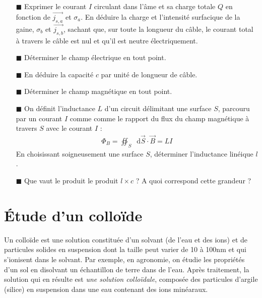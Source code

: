 \documentclass{report}
\newcommand*\dif{\mathop{}\!\mathrm{d}}
\begin{document}
\begin{itemize}

	\item[$\blacksquare$] Exprimer le courant $I$ circulant dans l'âme et sa charge totale $Q$ en fonction de $\vec{j_{s,a}}$ et $\sigma_a$. En déduire la charge et l'intensité surfacique de la gaine, $\sigma_b$ et $\vec{j_{s,b}}$, sachant que, sur toute la longueur du câble, le courant total à travers le câble est nul et qu'il est neutre électriquement.
	
	\item[$\blacksquare$] Déterminer le champ électrique en tout point.

	\item[$\blacksquare$] En déduire la capacité $c$ par unité de longueur de câble. 
	
	\item[$\blacksquare$]	 Déterminer le champ magnétique en tout point. 
	
	\item[$\blacksquare$] On définit l'inductance $L$ d'un circuit délimitant une surface $S$, parcouru par un courant $I$ comme  comme le rapport du flux du champ magnétique à travers $S$ avec le courant $I$ :
	\begin{align*}
		\Phi_B=\oiint_S \dif \vec{S}\cdot\vec{B}=LI
	\end{align*}
En choisissant soigneusement une surface $S$, déterminer l'inductance linéique $l$. 

	\item[$\blacksquare$] Que vaut le produit le produit $l\times c$ ? A quoi correspond cette grandeur ?
	
\end{itemize}

\newpage

\section*{Étude d'un colloïde}

Un colloïde est une solution constituée d'un solvant (de l'eau et des ions) et de particules solides en suspension dont la taille peut varier de 10 à 100nm et qui s'ionisent dans le solvant. Par exemple, en agronomie, on étudie les propriétés d'un sol en disolvant un échantillon de terre dans de l'eau. Après traitement, la solution qui en résulte est \textit{une solution colloïdale}, composée des particules d'argile (silice) en suspension dans une eau contenant des ions minéaraux. 
\end{document}
